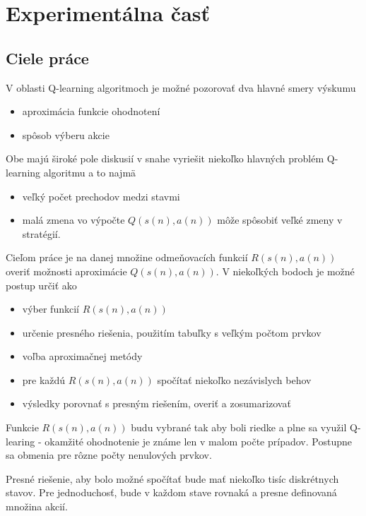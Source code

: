 \chapter{Experimentálna časť}


\section {Ciele práce}

V oblasti Q-learning algoritmoch je možné pozorovať dva hlavné smery výskumu

\begin{itemize}
\item aproximácia funkcie ohodnotení
\item spôsob výberu akcie
\end{itemize}

Obe majú široké pole diskusií v snahe vyriešit niekoľko hlavných problém Q-learning
algoritmu a to najmä

\begin{itemize}
\item veľký počet prechodov medzi stavmi
\item malá zmena vo výpočte $Q(s(n),a(n))$ môže spôsobiť veľké zmeny v stratégií.
\end{itemize}

Cieľom práce je na danej množine odmeňovacích funkcií $R(s(n), a(n))$ overiť
možnosti aproximácie $Q(s(n), a(n))$.
V niekoľkých bodoch je možné postup určiť ako

\begin{itemize}
\item výber funkcií $R(s(n), a(n))$
\item určenie presného riešenia, použitím tabuľky s veľkým počtom prvkov
\item voľba aproximačnej metódy
\item pre každú $R(s(n), a(n))$ spočítať niekoľko nezávislych behov
\item výsledky porovnať s presným riešením, overiť a zosumarizovať
\end{itemize}

Funkcie $R(s(n), a(n))$ budu vybrané tak aby boli riedke a plne sa využil Q-learing -
okamžité ohodnotenie je známe len v malom počte prípadov.
Postupne sa obmenia pre rôzne počty nenulových prvkov.

Presné riešenie, aby bolo možné spočítať bude mať niekoľko tisíc diskrétnych stavov.
Pre jednoduchosť, bude v každom stave rovnaká a presne definovaná množina akcií.

